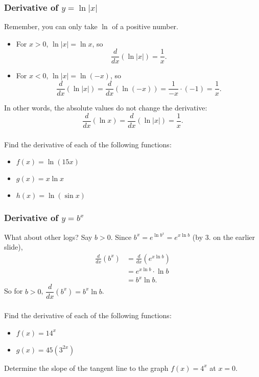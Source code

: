 \documentclass[14pt]{beamer}
\begin{document}
\begin{frame}
\frametitle{Derivative of $y=\ln |x|$}
\footnotesize
Remember, you can only take $\ln{}$ of a positive number.
\begin{itemize}
\item For $x>0$, $\ln |x| = \ln x$, so 
\[\dfrac{d}{dx} (\ln |x|)=\dfrac{1}{x}.\]
\item For $x<0$, $\ln |x| = \ln(-x)$, so 
\[\dfrac{d}{dx} (\ln |x|)= \dfrac{d}{dx} (\ln(-x)) = \dfrac{1}{-x} \cdot (-1) = \dfrac{1}{x}.\]
\end{itemize}
In other words, the absolute values do not change the derivative:
\[\dfrac{d}{dx}(\ln x)=\dfrac{d}{dx}(\ln |x|)=\dfrac{1}{x}.\]
\end{frame}

\begin{frame}%
\frametitle{}
\begin{exe} Find the derivative of each of the following functions:

\begin{itemize}
\item $f(x)=\ln(15x)$

\vspace{0.75pc}
\item $g(x)=x \ln x$

\vspace{0.75pc}
\item $h(x)=\ln(\sin x)$
\end{itemize}
\end{exe}
\end{frame}

\begin{frame}
\frametitle{Derivative of $y=b^x$}
What about other logs?  Say $b>0$.  Since $b^x=e^{\ln b^x}=e^{x \ln b}$ (by 3. on the earlier slide), 
\begin{align*}
\frac{d}{dx}(b^x) &= \frac{d}{dx}(e^{x \ln b}) \\[0.75pc]
 &=e^{x \ln b} \cdot \ln b \\[0.75pc]
 &= b^x \ln b.
\end{align*}
So for $b>0$, $\dfrac{d}{dx}(b^x)=b^x \ln b$.
\end{frame}

\begin{frame}
\frametitle{}
\begin{exe} Find the derivative of each of the following functions:
\begin{itemize}
\item $f(x)=14^x$

\vspace{0.75pc}
\item $g(x)=45(3^{2x})$
\end{itemize}
\end{exe}

\begin{exe} Determine the slope of the tangent line to the graph $f(x)=4^x$ at $x=0$. \end{exe}
\end{frame}
\end{document}

